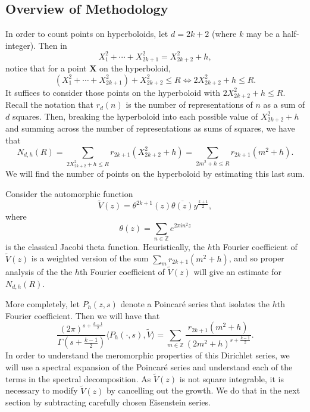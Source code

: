 \subsection*{Overview of Methodology}



In order to count points on hyperboloids, let $d = 2k + 2$ (where $k$ may be a
half-integer).
Then in
\begin{equation}
  X_1^2 + \cdots + X_{2k+1}^2 = X_{2k+2}^2 + h,
\end{equation}
notice that for a point $\bm{X}$ on the hyperboloid,
\begin{equation}
  (X_1^2 + \cdots + X_{2k+1}^2) + X_{2k+2}^2 \leq R \iff 2X_{2k+2}^2 + h \leq R.
\end{equation}
It suffices to consider those points on the hyperboloid with $2X_{2k+2}^2 + h \leq R$.
Recall the notation that $r_d(n)$ is the number of representations of $n$ as a sum of
$d$ squares.
Then, breaking the hyperboloid into each possible value of $X_{2k+2}^2 + h$ and summing
across the number of representations as sums of squares, we have that
\begin{equation}\label{eq:hyp:points_equals_sum}
  N_{d,h}(R) = \sum_{2X_{2k+2}^2 + h \leq R} r_{2k+1}(X_{2k+2}^2 + h) = \sum_{2m^2 + h
  \leq R} r_{2k+1}(m^2 + h).
\end{equation}
We will find the number of points on the hyperboloid by estimating this last sum.


Consider the automorphic function
\begin{equation}
  \widetilde{V}(z) = \theta^{2k+1}(z) \overline{\theta(z)}y^{\frac{k+1}{2}},
\end{equation}
where
\begin{equation}
  \theta(z) = \sum_{n \in \mathbb{Z}} e^{2\pi i n^2 z}
\end{equation}
is the classical Jacobi theta function.
Heuristically, the $h$th Fourier coefficient of $\widetilde{V}(z)$ is a weighted
version of the sum $\sum_m r_{2k+1}(m^2+h)$, and so proper analysis of the the $h$th
Fourier coefficient of $\widetilde{V}(z)$ will give an estimate for $N_{d,h}(R)$.


More completely, let $P_h(z,s)$ denote a Poincar\'e series that isolates the $h$th Fourier
coefficient.
Then we will have that
\begin{equation}
  \frac{(2\pi)^{s + \frac{k-1}{2}}}{\Gamma(s + \frac{k-1}{2})} \langle P_h(\cdot, s),
  \widetilde{V} \rangle = \sum_{m \in \mathbb{Z}}
  \frac{r_{2k+1}(m^2+h)}{(2m^2+h)^{s+\frac{k-1}{2}}}.
\end{equation}
In order to understand the meromorphic properties of this Dirichlet series, we
will use a spectral expansion of the Poincar\'e series and understand each of the terms in
the spectral decomposition.
As $\widetilde{V}(z)$ is not square integrable, it is necessary to modify
$\widetilde{V}(z)$ by cancelling out the growth.
We do that in the next section by subtracting carefully chosen Eisenstein series.


